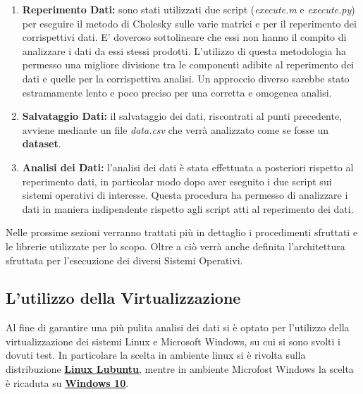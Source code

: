 \begin{enumerate}
    \item \textbf{Reperimento Dati:} sono stati utilizzati due script (\textit{execute.m} e \textit{execute.py}) per eseguire il metodo di Cholesky sulle varie matrici e per il reperimento dei corrispettivi dati. E' doveroso sottolineare che essi non hanno il compito di analizzare i dati da essi stessi prodotti. L'utilizzo di questa metodologia ha permesso una migliore divisione tra le componenti adibite al reperimento dei dati e quelle per la corrispettiva analisi. 
    Un approccio diverso sarebbe stato estramamente lento e poco preciso per una corretta e omogenea analisi.
    \item \textbf{Salvataggio Dati:} il salvataggio dei dati, riscontrati al punti precedente, avviene mediante un file \textit{data.csv} che verrà analizzato come se fosse un \textbf{dataset}.
    \item \textbf{Analisi dei Dati:} l'analisi dei dati è stata effettuata a posteriori rispetto al reperimento dati, in particolar modo dopo aver eseguito i due script sui sistemi operativi di interesse. Questa procedura ha permesso di analizzare i dati in maniera indipendente rispetto agli script atti al reperimento dei dati.
\end{enumerate}
Nelle prossime sezioni verranno trattati più in dettaglio i procedimenti sfruttati e le librerie utilizzate per lo scopo. Oltre a ciò verrà anche definita l'architettura sfruttata per l'esecuzione dei diversi Sistemi Operativi.
\subsection{L'utilizzo della Virtualizzazione}
Al fine di garantire una più pulita analisi dei dati si è optato per l'utilizzo della virtualizzazione dei sistemi Linux e Microsoft Windows, su cui si sono svolti i dovuti test. In particolare la scelta in ambiente linux si è rivolta sulla distribuzione \textbf{\href{https://lubuntu.me/}{Linux Lubuntu}}, mentre in ambiente Microfost Windows la scelta è ricaduta su \textbf{\href{https://www.microsoft.com/it-it/software-download/windows10}{Windows 10}}.
